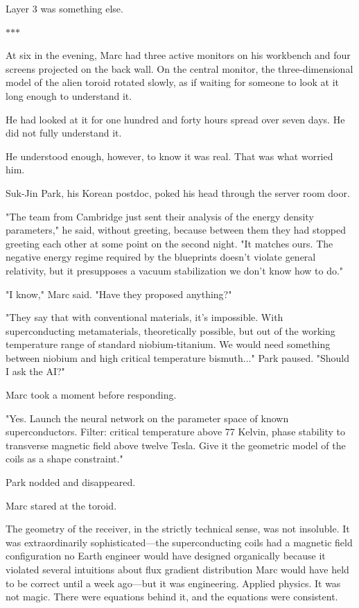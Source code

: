 \documentclass[11pt,a5paper,twoside]{book}
\begin{document}
Layer 3 was something else.

\vspace{1.5em}
\begin{center}$\ast$\quad$\ast$\quad$\ast$\end{center}
\vspace{1.5em}

At six in the evening, Marc had three active monitors on his workbench and four screens projected on the back wall. On the central monitor, the three-dimensional model of the alien toroid rotated slowly, as if waiting for someone to look at it long enough to understand it.

He had looked at it for one hundred and forty hours spread over seven days. He did not fully understand it.

He understood enough, however, to know it was real. That was what worried him.

Suk-Jin Park, his Korean postdoc, poked his head through the server room door.

"The team from Cambridge just sent their analysis of the energy density parameters," he said, without greeting, because between them they had stopped greeting each other at some point on the second night. "It matches ours. The negative energy regime required by the blueprints doesn't violate general relativity, but it presupposes a vacuum stabilization we don't know how to do."

"I know," Marc said. "Have they proposed anything?"

"They say that with conventional materials, it's impossible. With superconducting metamaterials, theoretically possible, but out of the working temperature range of standard niobium-titanium. We would need something between niobium and high critical temperature bismuth..." Park paused. "Should I ask the AI?"

Marc took a moment before responding.

"Yes. Launch the neural network on the parameter space of known superconductors. Filter: critical temperature above 77 Kelvin, phase stability to transverse magnetic field above twelve Tesla. Give it the geometric model of the coils as a shape constraint."

Park nodded and disappeared.

Marc stared at the toroid.

The geometry of the receiver, in the strictly technical sense, was not insoluble. It was extraordinarily sophisticated—the superconducting coils had a magnetic field configuration no Earth engineer would have designed organically because it violated several intuitions about flux gradient distribution Marc would have held to be correct until a week ago—but it was engineering. Applied physics. It was not magic. There were equations behind it, and the equations were consistent.
\end{document}
